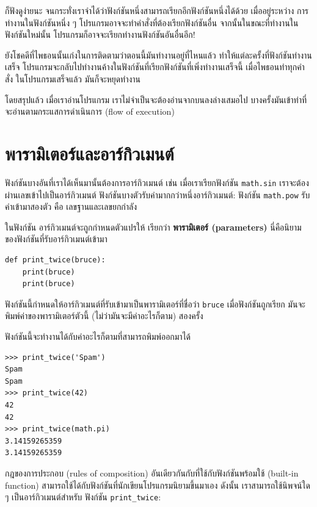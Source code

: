 ก็ฟังดูง่ายนะ จนกระทั่งเราจำได้ว่าฟังก์ชันหนึ่งสามารถเรียกอีกฟังก์ชันหนึ่งได้ด้วย  เมื่ออยู่ระหว่าง
การทำงานในฟังก์ชันหนึ่ง ๆ โปรแกรมอาจจะทำคำสั่งที่ต้องเรียกฟังก์ชันอื่น จากนั้นในขณะที่ทำงานใน
ฟังก์ชันใหม่นั้น โปรแกรมก็อาจจะเรียกทำงานฟังก์ชันอันอื่นอีก!

ยังโชคดีที่ไพธอนนั้นเก่งในการติดตามว่าตอนนี้มันทำงานอยู่ที่ไหนแล้ว ทำให้แต่ละครั้งที่ฟังก์ชันทำงานเสร็จ
โปรแกรมจะกลับไปทำงานค้างในฟังก์ชันที่เรียกฟังก์ชันที่เพิ่งทำงานเสร็จนี้ เมื่อไพธอนทำทุกคำสั่ง
ในโปรแกรมเสร็จแล้ว มันก็จะหยุดทำงาน

โดยสรุปแล้ว เมื่อเราอ่านโปรแกรม เราไม่จำเป็นจะต้องอ่านจากบนลงล่างเสมอไป
บางครั้งมันเข้าท่าที่จะอ่านตามกระแสการดำเนินการ (flow of execution)


\section{พารามิเตอร์และอาร์กิวเมนต์} %
\label{parameters}

ฟังก์ชันบางอันที่เราได้เห็นมานั้นต้องการอาร์กิวเมนต์ เช่น เมื่อเราเรียกฟังก์ชัน {\tt math.sin}
เราจะต้องผ่านเลขเข้าไปเป็นอาร์กิวเมนต์ ฟังก์ชันบางตัวรับค่ามากกว่าหนึ่งอาร์กิวเมนต์: 
ฟังก์ชัน {\tt math.pow} รับค่าเข้ามาสองตัว คือ เลขฐานและเลขยกกำลัง

ในฟังก์ชัน อาร์กิวเมนต์จะถูกกำหนดตัวแปรให้ เรียกว่า {\bf พารามิเตอร์ (parameters)}
นี่คือนิยามของฟังก์ชันที่รับอาร์กิวเมนต์เข้ามา

\begin{verbatim}
def print_twice(bruce):
    print(bruce)
    print(bruce)
\end{verbatim}
%
ฟังก์ชันนี้กำหนดให้อาร์กิวเมนต์ที่รับเข้ามาเป็นพารามิเตอร์ที่ชื่อว่า {\tt bruce}  เมื่อฟังก์ชันถูกเรียก
มันจะพิมพ์ค่าของพารามิเตอร์ตัวนี้ (ไม่ว่ามันจะมีค่าอะไรก็ตาม) สองครั้ง 

ฟังก์ชันนี้จะทำงานได้กับค่าอะไรก็ตามที่สามารถพิมพ์ออกมาได้

\begin{verbatim}
>>> print_twice('Spam')
Spam
Spam
>>> print_twice(42)
42
42
>>> print_twice(math.pi)
3.14159265359
3.14159265359
\end{verbatim}
%
กฎของการประกอบ (rules of composition) อันเดียวกันกับที่ใช้กับฟังก์ชันพร้อมใช้ (built-in function) 
สามารถใช้ได้กับฟังก์ชันที่นักเขียนโปรแกรมนิยามขึ้นมาเอง  ดังนั้น เราสามารถใช้นิพจน์ใด ๆ เป็นอาร์กิวเมนต์สำหรับ
ฟังก์ชัน \verb|print_twice|:

